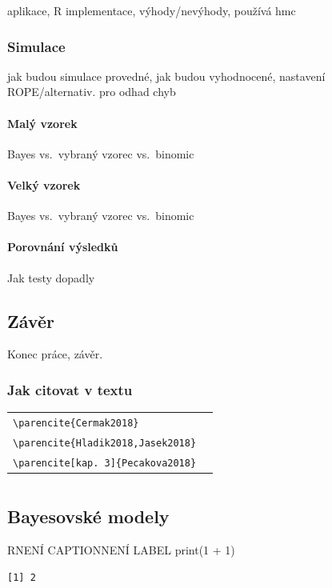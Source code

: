 \documentclass[
  11pt,
  a4paper]{report}
\begin{document}
aplikace, R implementace, výhody/nevýhody, používá hmc

\section{Simulace}\label{simulace}

jak budou simulace provedné, jak budou vyhodnocené, nastavení
ROPE/alternativ. pro odhad chyb

\subsection{Malý vzorek}\label{maluxfd-vzorek}

Bayes vs.~vybraný vzorec vs.~binomic

\subsection{Velký vzorek}\label{velkuxfd-vzorek}

Bayes vs.~vybraný vzorec vs.~binomic

\subsection{Porovnání výsledků}\label{porovnuxe1nuxed-vuxfdsledkux16f}

Jak testy dopadly

{
\pagestyle{plain}
\chapter*{Závěr}

Konec práce, závěr.

\section{Jak citovat v textu}
\begin{center}
\begin{tabularx}{\textwidth}{l@{~~$\longrightarrow$~~}X}
\verb|\parencite{Cermak2018}|&\parencite{Cermak2018}\\
\verb|\parencite{Hladik2018,Jasek2018}|&\parencite{Hladik2018,Jasek2018}\\
\verb|\parencite[kap. 3]{Pecakova2018}|&\parencite[kap. 3]{Pecakova2018}\\
\end{tabularx}
\end{center}

}

\printbibliography[title={\bibnamex},heading={bibintoc}]

\part*{\Prilohy\thispagestyle{empty}}
\appendix

\chapter{Bayesovské modely}\label{bayesovskuxe9-modely}

\begin{code}{R}{NENÍ CAPTION}{NENÍ LABEL}
print(1 + 1)
\end{code}

\begin{verbatim}
[1] 2
\end{verbatim}
\end{document}

